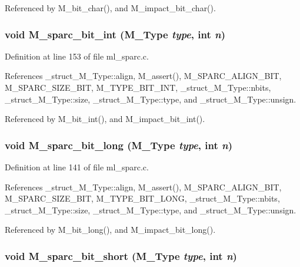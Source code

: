 Referenced by M\_\-bit\_\-char(), and M\_\-impact\_\-bit\_\-char().
\subsubsection{\setlength{\rightskip}{0pt plus 5cm}void M\_\-sparc\_\-bit\_\-int (\bf{M\_\-Type} {\em type}, int {\em n})}\label{ml__sparc_8c_9be4072680fa6e9bcc6e78e8e7f49023}




Definition at line 153 of file ml\_\-sparc.c.

References \_\-struct\_\-M\_\-Type::align, M\_\-assert(), M\_\-SPARC\_\-ALIGN\_\-BIT, M\_\-SPARC\_\-SIZE\_\-BIT, M\_\-TYPE\_\-BIT\_\-INT, \_\-struct\_\-M\_\-Type::nbits, \_\-struct\_\-M\_\-Type::size, \_\-struct\_\-M\_\-Type::type, and \_\-struct\_\-M\_\-Type::unsign.

Referenced by M\_\-bit\_\-int(), and M\_\-impact\_\-bit\_\-int().
\subsubsection{\setlength{\rightskip}{0pt plus 5cm}void M\_\-sparc\_\-bit\_\-long (\bf{M\_\-Type} {\em type}, int {\em n})}\label{ml__sparc_8c_bea824f22e6293c632bf11d5f106cb3c}




Definition at line 141 of file ml\_\-sparc.c.

References \_\-struct\_\-M\_\-Type::align, M\_\-assert(), M\_\-SPARC\_\-ALIGN\_\-BIT, M\_\-SPARC\_\-SIZE\_\-BIT, M\_\-TYPE\_\-BIT\_\-LONG, \_\-struct\_\-M\_\-Type::nbits, \_\-struct\_\-M\_\-Type::size, \_\-struct\_\-M\_\-Type::type, and \_\-struct\_\-M\_\-Type::unsign.

Referenced by M\_\-bit\_\-long(), and M\_\-impact\_\-bit\_\-long().
\subsubsection{\setlength{\rightskip}{0pt plus 5cm}void M\_\-sparc\_\-bit\_\-short (\bf{M\_\-Type} {\em type}, int {\em n})}\label{ml__sparc_8c_77961261fa57e30daba61921c5552cda}





